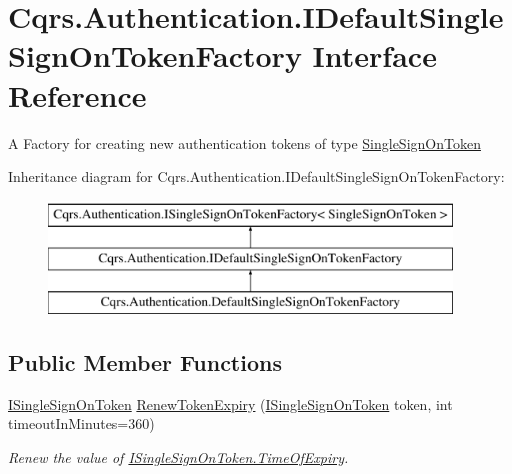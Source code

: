 \hypertarget{interfaceCqrs_1_1Authentication_1_1IDefaultSingleSignOnTokenFactory}{}\section{Cqrs.\+Authentication.\+I\+Default\+Single\+Sign\+On\+Token\+Factory Interface Reference}
\label{interfaceCqrs_1_1Authentication_1_1IDefaultSingleSignOnTokenFactory}


A Factory for creating new authentication tokens of type \hyperlink{classCqrs_1_1Authentication_1_1SingleSignOnToken}{Single\+Sign\+On\+Token}  


Inheritance diagram for Cqrs.\+Authentication.\+I\+Default\+Single\+Sign\+On\+Token\+Factory\+:\begin{figure}[H]
\begin{center}
\leavevmode
\includegraphics[height=3.000000cm]{interfaceCqrs_1_1Authentication_1_1IDefaultSingleSignOnTokenFactory}
\end{center}
\end{figure}
\subsection*{Public Member Functions}
\begin{DoxyCompactItemize}
\item 
\hyperlink{interfaceCqrs_1_1Authentication_1_1ISingleSignOnToken}{I\+Single\+Sign\+On\+Token} \hyperlink{interfaceCqrs_1_1Authentication_1_1IDefaultSingleSignOnTokenFactory_aff3e7060705a3a8e021c1182ce101b33_aff3e7060705a3a8e021c1182ce101b33}{Renew\+Token\+Expiry} (\hyperlink{interfaceCqrs_1_1Authentication_1_1ISingleSignOnToken}{I\+Single\+Sign\+On\+Token} token, int timeout\+In\+Minutes=360)
\begin{DoxyCompactList}\small\item\em Renew the value of \hyperlink{interfaceCqrs_1_1Authentication_1_1ISingleSignOnToken_a50af484569cc78f88acb01f1938a7cd8_a50af484569cc78f88acb01f1938a7cd8}{I\+Single\+Sign\+On\+Token.\+Time\+Of\+Expiry}. \end{DoxyCompactList}\end{DoxyCompactItemize}


